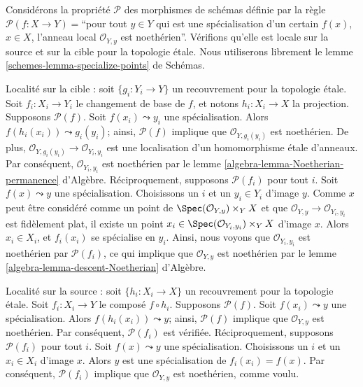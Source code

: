 \begin{example}
\label{example-silly-two}
Considérons la propriété $\mathcal{P}$ des morphismes de schémas définie par
la règle $\mathcal{P}(f : X \to Y) = $``pour tout $y \in Y$ qui est une
spécialisation d'un certain $f(x)$, $x \in X$, l'anneau local
$\mathcal{O}_{Y, y}$ est noethérien''.
Vérifions qu'elle est locale sur la source et sur la cible pour la topologie
\'etale. Nous utiliserons librement le
lemme \ref{schemes-lemma-specialize-points} de Schémas.

\medskip\noindent
Localité sur la cible : soit $\{g_i : Y_i \to Y\}$ un recouvrement pour la
topologie \'etale.
Soit $f_i : X_i \to Y_i$ le changement de base de $f$, et notons
$h_i : X_i \to X$ la projection. Supposons $\mathcal{P}(f)$.
Soit $f(x_i) \leadsto y_i$ une spécialisation.
Alors $f(h_i(x_i)) \leadsto g_i(y_i)$; ainsi, $\mathcal{P}(f)$ implique que
$\mathcal{O}_{Y, g_i(y_i)}$ est noethérien.
De plus, $\mathcal{O}_{Y, g_i(y_i)} \to \mathcal{O}_{Y_i, y_i}$ est une
localisation d'un homomorphisme \'etale d'anneaux.
Par conséquent, $\mathcal{O}_{Y_i, y_i}$ est noethérien par le
lemme \ref{algebra-lemma-Noetherian-permanence} d'Algèbre.
Réciproquement, supposons $\mathcal{P}(f_i)$ pour tout $i$.
Soit $f(x) \leadsto y$ une spécialisation. Choisissons un $i$ et un
$y_i \in Y_i$ d'image $y$.
Comme $x$ peut être considéré comme un point de
$\Spec(\mathcal{O}_{Y, y}) \times_Y X$ et que
$\mathcal{O}_{Y, y} \to \mathcal{O}_{Y_i, y_i}$ est fidèlement plat,
il existe un point
$x_i \in \Spec(\mathcal{O}_{Y_i, y_i}) \times_Y X$
d'image $x$. Alors $x_i \in X_i$, et $f_i(x_i)$ se spécialise en $y_i$.
Ainsi, nous voyons que $\mathcal{O}_{Y_i, y_i}$ est noethérien par
$\mathcal{P}(f_i)$, ce qui implique que $\mathcal{O}_{Y, y}$ est noethérien par
le lemme \ref{algebra-lemma-descent-Noetherian} d'Algèbre.

\medskip\noindent
Localité sur la source : soit $\{h_i : X_i \to X\}$ un recouvrement pour la
topologie \'etale.
Soit $f_i : X_i \to Y$ le composé $f \circ h_i$.
Supposons $\mathcal{P}(f)$. Soit $f(x_i) \leadsto y$ une spécialisation.
Alors $f(h_i(x_i)) \leadsto y$; ainsi, $\mathcal{P}(f)$ implique que
$\mathcal{O}_{Y, y}$ est noethérien. Par conséquent, $\mathcal{P}(f_i)$ est
vérifiée. Réciproquement, supposons $\mathcal{P}(f_i)$ pour tout $i$.
Soit $f(x) \leadsto y$ une spécialisation. Choisissons un $i$ et un
$x_i \in X_i$ d'image $x$.
Alors $y$ est une spécialisation de $f_i(x_i) = f(x)$.
Par conséquent, $\mathcal{P}(f_i)$ implique que $\mathcal{O}_{Y, y}$ est
noethérien, comme voulu.


\end{example}
